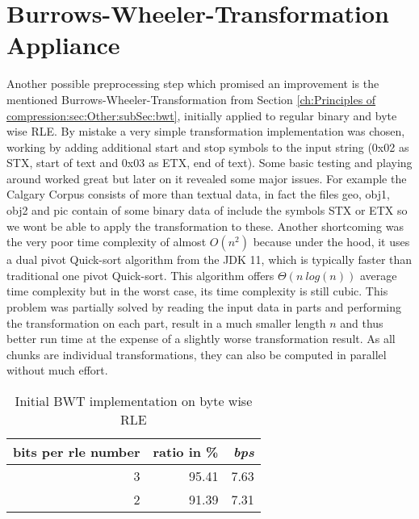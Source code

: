 \section{Burrows-Wheeler-Transformation Appliance}
\par{
Another possible preprocessing step which promised an improvement is the mentioned Burrows-Wheeler-Transformation from Section \ref{ch:Principles of compression:sec:Other:subSec:bwt}, initially applied to regular binary and byte wise RLE. By mistake a very simple transformation implementation was chosen, working by adding additional start and stop symbols to the input string (0x02 as STX, start of text and 0x03 as ETX, end of text). Some basic testing and playing around worked great but later on it revealed some major issues. For example the Calgary Corpus consists of more than textual data, in fact the files geo, obj1, obj2 and pic contain of some binary data of include the symbols STX or ETX so we wont be able to apply the transformation to these. Another shortcoming was the very poor time complexity of almost $O (n^2)$ because under the hood, it uses a dual pivot Quick-sort algorithm from the JDK 11, which is typically faster than traditional one pivot Quick-sort. This algorithm offers $\Theta (n \: log(n))$ average time complexity but in the worst case, its time complexity is still cubic. This problem was partially solved by reading the input data in parts and performing the transformation on each part, result in a much smaller length $n$ and thus better run time at the expense of a slightly worse transformation result. As all chunks are individual transformations, they can also be computed in parallel without much effort.

\begin{table}[h]
	\centering
	\begin{tabular}{r|r|r}	
		bits per rle number & ratio in \% & \textit{bps}\\
		\hline
		3 & 95.41 & 7.63\\
		2 & 91.39 & 7.31 \\
	\end{tabular}
	\caption{Initial BWT implementation on byte wise RLE}
	\label{tab:t11 Simple Burrows Wheeler Transformation on byte wise RLE}
\end{table}
}
